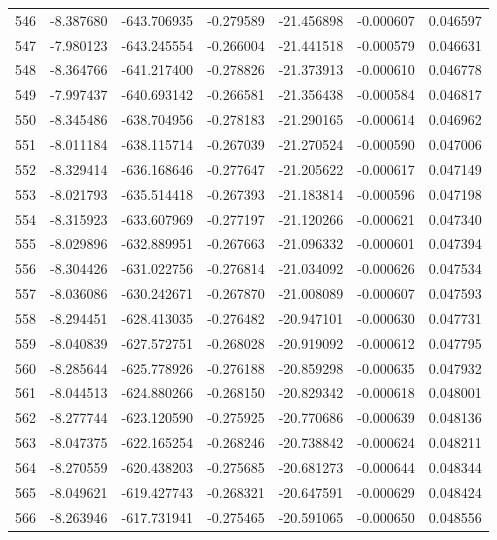 \begin{tabular}{rrrrrrr}
 546 &  -8.387680 & -643.706935 & -0.279589 & -21.456898 &  -0.000607 &  0.046597 \\
 547 &  -7.980123 & -643.245554 & -0.266004 & -21.441518 &  -0.000579 &  0.046631 \\
 548 &  -8.364766 & -641.217400 & -0.278826 & -21.373913 &  -0.000610 &  0.046778 \\
 549 &  -7.997437 & -640.693142 & -0.266581 & -21.356438 &  -0.000584 &  0.046817 \\
 550 &  -8.345486 & -638.704956 & -0.278183 & -21.290165 &  -0.000614 &  0.046962 \\
 551 &  -8.011184 & -638.115714 & -0.267039 & -21.270524 &  -0.000590 &  0.047006 \\
 552 &  -8.329414 & -636.168646 & -0.277647 & -21.205622 &  -0.000617 &  0.047149 \\
 553 &  -8.021793 & -635.514418 & -0.267393 & -21.183814 &  -0.000596 &  0.047198 \\
 554 &  -8.315923 & -633.607969 & -0.277197 & -21.120266 &  -0.000621 &  0.047340 \\
 555 &  -8.029896 & -632.889951 & -0.267663 & -21.096332 &  -0.000601 &  0.047394 \\
 556 &  -8.304426 & -631.022756 & -0.276814 & -21.034092 &  -0.000626 &  0.047534 \\
 557 &  -8.036086 & -630.242671 & -0.267870 & -21.008089 &  -0.000607 &  0.047593 \\
 558 &  -8.294451 & -628.413035 & -0.276482 & -20.947101 &  -0.000630 &  0.047731 \\
 559 &  -8.040839 & -627.572751 & -0.268028 & -20.919092 &  -0.000612 &  0.047795 \\
 560 &  -8.285644 & -625.778926 & -0.276188 & -20.859298 &  -0.000635 &  0.047932 \\
 561 &  -8.044513 & -624.880266 & -0.268150 & -20.829342 &  -0.000618 &  0.048001 \\
 562 &  -8.277744 & -623.120590 & -0.275925 & -20.770686 &  -0.000639 &  0.048136 \\
 563 &  -8.047375 & -622.165254 & -0.268246 & -20.738842 &  -0.000624 &  0.048211 \\
 564 &  -8.270559 & -620.438203 & -0.275685 & -20.681273 &  -0.000644 &  0.048344 \\
 565 &  -8.049621 & -619.427743 & -0.268321 & -20.647591 &  -0.000629 &  0.048424 \\
 566 &  -8.263946 & -617.731941 & -0.275465 & -20.591065 &  -0.000650 &  0.048556 \\

\end{tabular}

